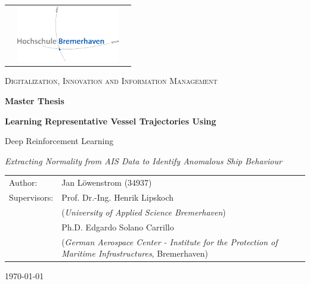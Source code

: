 \begin{titlepage}
\begin{tabular}{lcr}
  \hspace{10cm} &
  \includegraphics[width=170px]{images/hb_logo_2c.jpg}
  \vspace{1cm}
\end{tabular}
	\centering	
	\vspace{0cm}
	{\scshape\Large Digitalization, Innovation and Information Management \par}
	\vspace{1.5cm}
	{\Large\bfseries Master Thesis\par}
	\centering
    \vspace{2cm}
    {\Large\bfseries 
      Learning Representative Vessel Trajectories       Using  \par Deep Reinforcement Learning   \par
}
       {\normalsize\itshape
  Extracting Normality from AIS Data to Identify Anomalous Ship Behaviour
      \par}
	\vfill
	\vspace{2cm}
	\begin{tabularx}{\textwidth}{lX}
		Author: & Jan Löwenstrom (34937)\\
		Supervisors: & Prof. Dr.-Ing. Henrik Lipskoch \\ &(\textit{University of Applied Science Bremerhaven}) \\
		& Ph.D. Edgardo Solano Carrillo \\&(\textit{German Aerospace Center - Institute for the Protection of Maritime Infrastructures}, Bremerhaven)
		        
	\end{tabularx}  
    \vfill

	{\large \today \par}       
\end{titlepage}
\restoregeometry